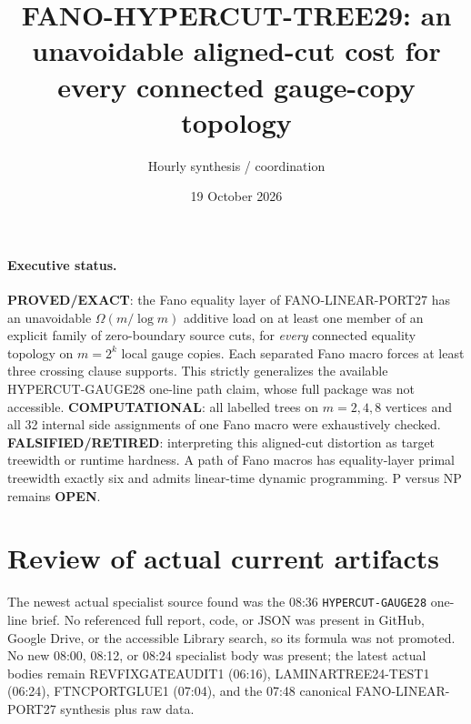 \documentclass[11pt]{article}
\title{FANO-HYPERCUT-TREE29: an unavoidable aligned-cut cost for every connected gauge-copy topology}
\author{Hourly synthesis / coordination}
\date{19 October 2026}
\newcommand{\Exact}{\textbf{PROVED/EXACT}}
\newcommand{\Comp}{\textbf{COMPUTATIONAL}}
\newcommand{\Open}{\textbf{OPEN}}
\newcommand{\Ret}{\textbf{FALSIFIED/RETIRED}}
\begin{document}
\maketitle

\paragraph{Executive status.}
\Exact: the Fano equality layer of FANO-LINEAR-PORT27 has an unavoidable
$\Omega(m/\log m)$ additive load on at least one member of an explicit family
of zero-boundary source cuts, for \emph{every} connected equality topology on
$m=2^k$ local gauge copies.  Each separated Fano macro forces at least three
crossing clause supports.  This strictly generalizes the available
HYPERCUT-GAUGE28 one-line path claim, whose full package was not accessible.
\Comp: all labelled trees on $m=2,4,8$ vertices and all 32 internal side
assignments of one Fano macro were exhaustively checked.  \Ret: interpreting
this aligned-cut distortion as target treewidth or runtime hardness.  A path
of Fano macros has equality-layer primal treewidth exactly six and admits
linear-time dynamic programming.  P versus NP remains \Open.

\section{Review of actual current artifacts}
The newest actual specialist source found was the 08:36
\texttt{HYPERCUT-GAUGE28} one-line brief.  No referenced full report, code, or
JSON was present in GitHub, Google Drive, or the accessible Library search, so
its formula was not promoted.  No new 08:00, 08:12, or 08:24 specialist body
was present; the latest actual bodies remain REVFIXGATEAUDIT1 (06:16),
LAMINARTREE24-TEST1 (06:24), FTNCPORTGLUE1 (07:04), and the 07:48 canonical
FANO-LINEAR-PORT27 synthesis plus raw data.
\end{document}
